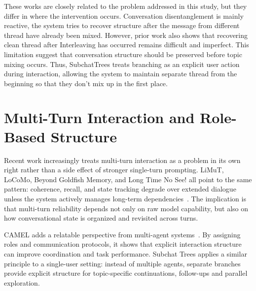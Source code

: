 


These works are closely related to the problem addressed in this study, but they differ in where the intervention occurs. Conversation disentanglement is mainly reactive, the system tries to recover structure after the message from different thread have already been mixed. However, prior work also shows that recovering clean thread after Interleaving has occurred remains difficult and imperfect. This limitation suggest that conversation structure should be preserved before topic mixing occurs. Thus, SubchatTrees treats branching as an explicit user action during interaction, allowing the system to maintain separate thread from the beginning so that they don't mix up in the first place. 



\section{Multi-Turn Interaction and Role-Based Structure}\label{subsec:multi_turn}

Recent work increasingly treats multi-turn interaction as a problem in its own right rather than a side effect of stronger single-turn prompting. LiMuT, LoCoMo, Beyond Goldfish Memory, and Long Time No See! all point to the same pattern: coherence, recall, and state tracking degrade over extended dialogue unless the system actively manages long-term dependencies~\cite{laban2024limt,maharana2024locomo,xu2022goldfish,xu2022longpersona}. The implication is that multi-turn reliability depends not only on raw model capability, but also on how conversational state is organized and revisited across turns.

CAMEL adds a relatable perspective from multi-agent systems~\cite{li2023camel}. By assigning roles and communication protocols, it shows that explicit interaction structure can improve coordination and task performance. Subchat Trees applies a similar principle to a single-user setting: instead of multiple agents, separate branches provide explicit structure for topic-specific continuations, follow-ups and parallel exploration.



